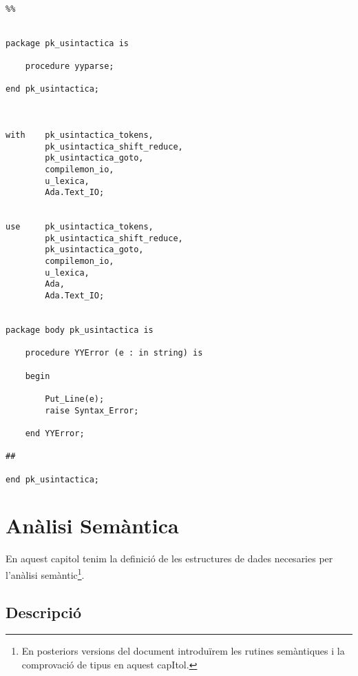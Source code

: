 \documentclass[10pt]{report}
\begin{document}
\begin{lstlisting}[style=Ada]
  
%%


package pk_usintactica is

    procedure yyparse;

end pk_usintactica;



with    pk_usintactica_tokens,
        pk_usintactica_shift_reduce,
        pk_usintactica_goto,
        compilemon_io,
        u_lexica,
        Ada.Text_IO;
        

use     pk_usintactica_tokens,
        pk_usintactica_shift_reduce,
        pk_usintactica_goto,
        compilemon_io,
        u_lexica,
        Ada,
        Ada.Text_IO;
        

package body pk_usintactica is

    procedure YYError (e : in string) is
    
    begin
        
        Put_Line(e);
        raise Syntax_Error;
    
    end YYError;
    
##

end pk_usintactica;
    \end{lstlisting}
    \newpage
    
    \chapter{Anàlisi Semàntica}
        En aquest capitol tenim la definició de les estructures de dades necesaries per l'anàlisi semàntic\footnote{En posteriors versions del document introduïrem les rutines semàntiques i la comprovació de tipus en aquest capItol.}.
        
    \section{Descripció}
\end{document}
